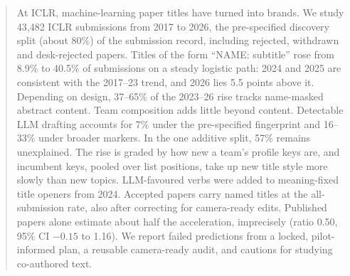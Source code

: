 \begin{abstract}
At ICLR, machine-learning paper titles have turned into brands. We study 43,482 ICLR submissions from 2017 to 2026, the pre-specified discovery split (about 80\%) of the submission record, including rejected, withdrawn and desk-rejected papers. Titles of the form ``NAME: subtitle'' rose from 8.9\% to 40.5\% of submissions on a steady logistic path: 2024 and 2025 are consistent with the 2017--23 trend, and 2026 lies 5.5 points above it. Depending on design, 37--65\% of the 2023--26 rise tracks name-masked abstract content. Team composition adds little beyond content. Detectable LLM drafting accounts for 7\% under the pre-specified fingerprint and 16--33\% under broader markers. In the one additive split, 57\% remains unexplained. The rise is graded by how new a team's profile keys are, and incumbent keys, pooled over list positions, take up new title style more slowly than new topics. LLM-favoured verbs were added to meaning-fixed title openers from 2024. Accepted papers carry named titles at the all-submission rate, also after correcting for camera-ready edits. Published papers alone estimate about half the acceleration, imprecisely (ratio 0.50, 95\% CI $-0.15$ to 1.16). We report failed predictions from a locked, pilot-informed plan, a reusable camera-ready audit, and cautions for studying co-authored text.
\end{abstract}
